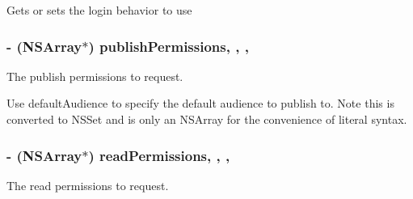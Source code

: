 Gets or sets the login behavior to use \hypertarget{interface_f_b_s_d_k_login_button_a7b546773564a1961a0e9403e6b48b286}{
\subsubsection[{publish\-Permissions}]{\setlength{\rightskip}{0pt plus 5cm}-\/ (N\-S\-Array$\ast$) publish\-Permissions\hspace{0.3cm}{\ttfamily [read]}, {\ttfamily [write]}, {\ttfamily [nonatomic]}, {\ttfamily [copy]}}}\label{interface_f_b_s_d_k_login_button_a7b546773564a1961a0e9403e6b48b286}
The publish permissions to request.

Use {\ttfamily default\-Audience} to specify the default audience to publish to. Note this is converted to N\-S\-Set and is only an N\-S\-Array for the convenience of literal syntax. \hypertarget{interface_f_b_s_d_k_login_button_a4086baec0d0b3203c6dd3b3d65d419f8}{
\subsubsection[{read\-Permissions}]{\setlength{\rightskip}{0pt plus 5cm}-\/ (N\-S\-Array$\ast$) read\-Permissions\hspace{0.3cm}{\ttfamily [read]}, {\ttfamily [write]}, {\ttfamily [nonatomic]}, {\ttfamily [copy]}}}\label{interface_f_b_s_d_k_login_button_a4086baec0d0b3203c6dd3b3d65d419f8}
The read permissions to request.

